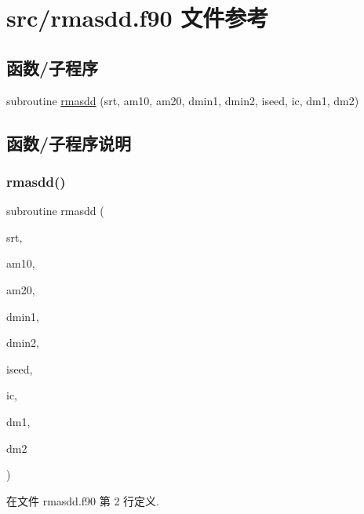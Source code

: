 \hypertarget{rmasdd_8f90}{}\section{src/rmasdd.f90 文件参考}
\label{rmasdd_8f90}
\subsection*{函数/子程序}
\begin{DoxyCompactItemize}
\item 
subroutine \mbox{\hyperlink{rmasdd_8f90_afd0efb44d15ea73adfd5724f7f135ec5}{rmasdd}} (srt, am10, am20, dmin1, dmin2, iseed, ic, dm1, dm2)
\end{DoxyCompactItemize}


\subsection{函数/子程序说明}
\mbox{\label{rmasdd_8f90_afd0efb44d15ea73adfd5724f7f135ec5}} 
\subsubsection{\texorpdfstring{rmasdd()}{rmasdd()}}
{\footnotesize\ttfamily subroutine rmasdd (\begin{DoxyParamCaption}\item[{}]{srt,  }\item[{}]{am10,  }\item[{}]{am20,  }\item[{}]{dmin1,  }\item[{}]{dmin2,  }\item[{}]{iseed,  }\item[{}]{ic,  }\item[{}]{dm1,  }\item[{}]{dm2 }\end{DoxyParamCaption})}



在文件 rmasdd.\+f90 第 2 行定义.


